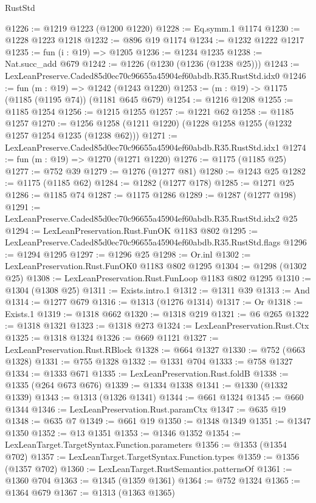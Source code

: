 \begin{lexlean}{RustStd}
\begin{coremodule}
@1226 := @1219 @1223 (@1200 @1220)
@1228 := Eq.symm.{1} @1174
@1230 := @1228 @1223 @1218
@1232 := @896 @19 @1174
@1234 := @1232 @1222 @1217
@1235 := fun (i : @19) => @1205
@1236 := @1234 @1235
@1238 := Nat.succ_add @679
@1242 := @1226 (@1230 (@1236 (@1238 @25)))
@1243 := LexLeanPreserve.Caded85d0ec70c96655a45904ef60abdb.R35.RustStd.idx0
@1246 := fun (m : @19) => @1242 (@1243 @1220)
@1253 := (m : @19) -> @1175 (@1185 (@1195 @74)) (@1181 @645 @679)
@1254 := @1216 @1208
@1255 := @1185 @1254
@1256 := @1215 @1255
@1257 := @1221 @62
@1258 := @1185 @1257
@1270 := @1256 @1258 (@1211 @1220) (@1228 @1258 @1255 (@1232 @1257 @1254 @1235 (@1238 @62)))
@1271 := LexLeanPreserve.Caded85d0ec70c96655a45904ef60abdb.R35.RustStd.idx1
@1274 := fun (m : @19) => @1270 (@1271 @1220)
@1276 := @1175 (@1185 @25)
@1277 := @752 @39
@1279 := @1276 (@1277 @81)
@1280 := @1243 @25
@1282 := @1175 (@1185 @62)
@1284 := @1282 (@1277 @178)
@1285 := @1271 @25
@1286 := @1185 @74
@1287 := @1175 @1286
@1289 := @1287 (@1277 @198)
@1291 := LexLeanPreserve.Caded85d0ec70c96655a45904ef60abdb.R35.RustStd.idx2 @25
@1294 := LexLeanPreservation.Rust.FunOK @1183 @802
@1295 := LexLeanPreserve.Caded85d0ec70c96655a45904ef60abdb.R35.RustStd.flags
@1296 := @1294 @1295
@1297 := @1296 @25
@1298 := Or.inl
@1302 := LexLeanPreservation.Rust.FunOK0 @1183 @802 @1295
@1304 := @1298 (@1302 @25)
@1308 := LexLeanPreservation.Rust.FunLoop @1183 @802 @1295
@1310 := @1304 (@1308 @25)
@1311 := Exists.intro.{1}
@1312 := @1311 @39
@1313 := And
@1314 := @1277 @679
@1316 := @1313 (@1276 @1314)
@1317 := Or
@1318 := Exists.{1}
@1319 := @1318 @662
@1320 := @1318 @219
@1321 := @6 @265
@1322 := @1318 @1321
@1323 := @1318 @273
@1324 := LexLeanPreservation.Rust.Ctx
@1325 := @1318 @1324
@1326 := @669 @1121
@1327 := LexLeanPreservation.Rust.RBlock
@1328 := @664 @1327
@1330 := @752 (@663 @1328)
@1331 := @755 @1328
@1332 := @1331 @704
@1333 := @758 @1327
@1334 := @1333 @671
@1335 := LexLeanPreservation.Rust.foldB
@1338 := @1335 (@264 @673 @676)
@1339 := @1334 @1338
@1341 := @1330 (@1332 @1339)
@1343 := @1313 (@1326 @1341)
@1344 := @661 @1324
@1345 := @660 @1344
@1346 := LexLeanPreservation.Rust.paramCtx
@1347 := @635 @19
@1348 := @635 @7
@1349 := @661 @19
@1350 := @1348 @1349
@1351 := @1347 @1350
@1352 := @13 @1351
@1353 := @1346 @1352
@1354 := LexLeanTarget.TargetSyntax.Function.parameters
@1356 := @1353 (@1354 @702)
@1357 := LexLeanTarget.TargetSyntax.Function.types
@1359 := @1356 (@1357 @702)
@1360 := LexLeanTarget.RustSemantics.patternsOf
@1361 := @1360 @704
@1363 := @1345 (@1359 @1361)
@1364 := @752 @1324
@1365 := @1364 @679
@1367 := @1313 (@1363 @1365)

\end{coremodule}
\end{lexlean}
